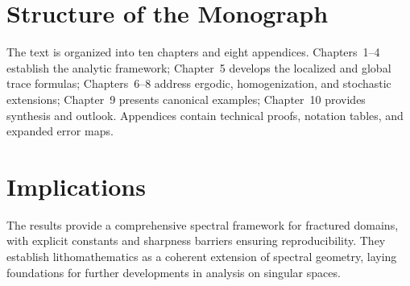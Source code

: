 \section*{Structure of the Monograph}

The text is organized into ten chapters and eight appendices. 
Chapters~1--4 establish the analytic framework; Chapter~5 develops the localized and 
global trace formulas; Chapters~6--8 address ergodic, homogenization, and stochastic 
extensions; Chapter~9 presents canonical examples; Chapter~10 provides synthesis 
and outlook. Appendices contain technical proofs, notation tables, and expanded 
error maps.

\section*{Implications}

The results provide a comprehensive spectral framework for fractured domains, 
with explicit constants and sharpness barriers ensuring reproducibility. 
They establish lithomathematics as a coherent extension of spectral geometry, 
laying foundations for further developments in analysis on singular spaces.


